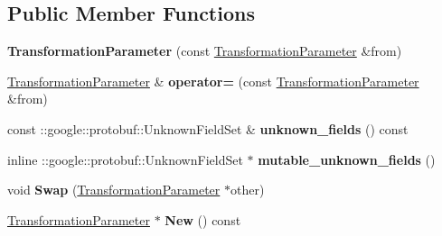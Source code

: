 \subsection*{Public Member Functions}
\begin{DoxyCompactItemize}
\item 
\mbox{\label{classcaffe_1_1_transformation_parameter_a5f3bf7e21a0b138909e8f79fe14c9079}} 
{\bfseries Transformation\+Parameter} (const \mbox{\hyperlink{classcaffe_1_1_transformation_parameter}{Transformation\+Parameter}} \&from)
\item 
\mbox{\label{classcaffe_1_1_transformation_parameter_a898cd4bab74b0477991a00400746e32a}} 
\mbox{\hyperlink{classcaffe_1_1_transformation_parameter}{Transformation\+Parameter}} \& {\bfseries operator=} (const \mbox{\hyperlink{classcaffe_1_1_transformation_parameter}{Transformation\+Parameter}} \&from)
\item 
\mbox{\label{classcaffe_1_1_transformation_parameter_a0df649b76fbb6b25dacf89625b18af6d}} 
const \+::google\+::protobuf\+::\+Unknown\+Field\+Set \& {\bfseries unknown\+\_\+fields} () const
\item 
\mbox{\label{classcaffe_1_1_transformation_parameter_a34152f0da6ea78505db2d8727bcf1677}} 
inline \+::google\+::protobuf\+::\+Unknown\+Field\+Set $\ast$ {\bfseries mutable\+\_\+unknown\+\_\+fields} ()
\item 
\mbox{\label{classcaffe_1_1_transformation_parameter_a45d63004ea061b326e8d1576f086ec4e}} 
void {\bfseries Swap} (\mbox{\hyperlink{classcaffe_1_1_transformation_parameter}{Transformation\+Parameter}} $\ast$other)
\item 
\mbox{\label{classcaffe_1_1_transformation_parameter_afb547fccf9a568b0ca25d19f5530d9e3}} 
\mbox{\hyperlink{classcaffe_1_1_transformation_parameter}{Transformation\+Parameter}} $\ast$ {\bfseries New} () const
\item 
\mbox{\label{classcaffe_1_1_transformation_parameter_a08762adeec58cde49c9a0ebcecd0802c}} 

\end{DoxyCompactItemize}
